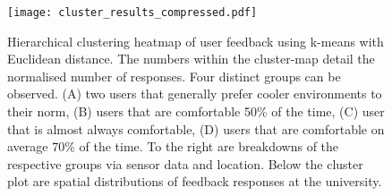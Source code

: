 \begin{figure}
\begin{center}
\texttt{[image: cluster\_results\_compressed.pdf]}
\caption{Hierarchical clustering heatmap of user feedback using k-means with Euclidean distance. The numbers within the cluster-map detail the normalised number of responses. Four distinct groups can be observed. (A) two users that generally prefer cooler environments to their norm, (B) users that are comfortable 50\% of the time, (C) user that is almost always comfortable, (D) users that are comfortable on average 70\% of the time. To the right are breakdowns of the respective groups via sensor data and location. Below the cluster plot are spatial distributions of feedback responses at the university.}
\label{fig:clustering}
\end{center}
\end{figure}


